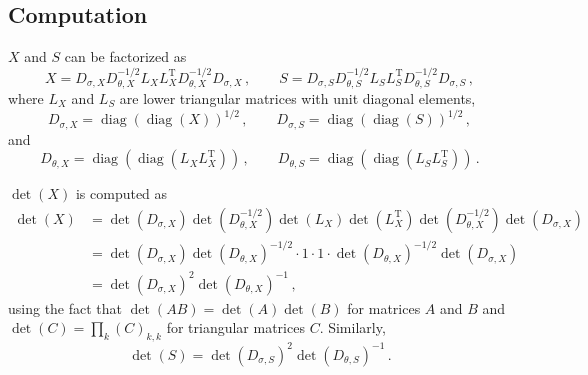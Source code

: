 \documentclass[12pt]{article}
\DeclareMathOperator{\diag}{diag}
\newcommand{\transpose}[1]{#1^{\mathrm{T}}}
\begin{document}
\subsection{Computation}

$X$ and $S$ can be factorized as
\begin{equation}
X = D_{\sigma,X} D_{\theta,X}^{-1/2} L_{X} \transpose{L_{X}} D_{\theta,X}^{-1/2} D_{\sigma,X}\,,\qquad S = D_{\sigma,S} D_{\theta,S}^{-1/2} L_{S} \transpose{L_{S}} D_{\theta,S}^{-1/2} D_{\sigma,S}\,,
\end{equation}
where $L_{X}$ and $L_{S}$ are lower triangular matrices
with unit diagonal elements,
\begin{equation}
D_{\sigma,X} = \diag(\diag(X))^{1/2}\,,\qquad D_{\sigma,S} = \diag(\diag(S))^{1/2}\,,
\end{equation}
and
\begin{equation}
D_{\theta,X} = \diag(\diag(L_{X} \transpose{L_{X}}))\,,\qquad D_{\theta,S} = \diag(\diag(L_{S} \transpose{L_{S}}))\,.
\end{equation}

$\det(X)$ is computed as
\begin{equation}
\begin{aligned}
\det(X)
  &= \det(D_{\sigma,X}) \det(D_{\theta,X}^{-1/2}) \det(L_{X}) \det(\transpose{L_{X}}) \det(D_{\theta,X}^{-1/2}) \det(D_{\sigma,X}) \\
  &= \det(D_{\sigma,X}) \det(D_{\theta,X})^{-1/2} \cdot 1 \cdot 1 \cdot \det(D_{\theta,X})^{-1/2} \det(D_{\sigma,X}) \\
  &= \det(D_{\sigma,X})^{2} \det(D_{\theta,X})^{-1}\,,
\end{aligned}
\end{equation}
using the fact that
$\det(A B) = \det(A) \det(B)$ for matrices $A$ and $B$
and
$\det(C) = \prod_{k} (C)_{k,k}$ for triangular matrices $C$.
Similarly,
\begin{equation}
\det(S) = \det(D_{\sigma,S})^{2} \det(D_{\theta,S})^{-1}\,.
\end{equation}
\end{document}
